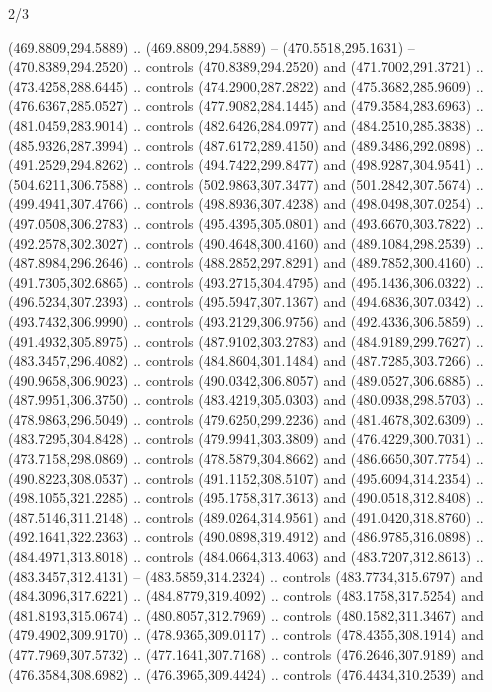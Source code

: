 \begin{flagdescription}{2/3}
\begin{scope}[xshift=0.5\flaglength,yshift=0.5\flagwidth,scale=\flagwidth/495.65]
\begin{scope}[y=0.8pt, x=0.8pt, yscale=-1,shift={(-463.76,-309.78)}]
  (469.8809,294.5889) .. (469.8809,294.5889) -- (470.5518,295.1631) --
  (470.8389,294.2520) .. controls (470.8389,294.2520) and (471.7002,291.3721) ..
  (473.4258,288.6445) .. controls (474.2900,287.2822) and (475.3682,285.9609) ..
  (476.6367,285.0527) .. controls (477.9082,284.1445) and (479.3584,283.6963) ..
  (481.0459,283.9014) .. controls (482.6426,284.0977) and (484.2510,285.3838) ..
  (485.9326,287.3994) .. controls (487.6172,289.4150) and (489.3486,292.0898) ..
  (491.2529,294.8262) .. controls (494.7422,299.8477) and (498.9287,304.9541) ..
  (504.6211,306.7588) .. controls (502.9863,307.3477) and (501.2842,307.5674) ..
  (499.4941,307.4766) .. controls (498.8936,307.4238) and (498.0498,307.0254) ..
  (497.0508,306.2783) .. controls (495.4395,305.0801) and (493.6670,303.7822) ..
  (492.2578,302.3027) .. controls (490.4648,300.4160) and (489.1084,298.2539) ..
  (487.8984,296.2646) .. controls (488.2852,297.8291) and (489.7852,300.4160) ..
  (491.7305,302.6865) .. controls (493.2715,304.4795) and (495.1436,306.0322) ..
  (496.5234,307.2393) .. controls (495.5947,307.1367) and (494.6836,307.0342) ..
  (493.7432,306.9990) .. controls (493.2129,306.9756) and (492.4336,306.5859) ..
  (491.4932,305.8975) .. controls (487.9102,303.2783) and (484.9189,299.7627) ..
  (483.3457,296.4082) .. controls (484.8604,301.1484) and (487.7285,303.7266) ..
  (490.9658,306.9023) .. controls (490.0342,306.8057) and (489.0527,306.6885) ..
  (487.9951,306.3750) .. controls (483.4219,305.0303) and (480.0938,298.5703) ..
  (478.9863,296.5049) .. controls (479.6250,299.2236) and (481.4678,302.6309) ..
  (483.7295,304.8428) .. controls (479.9941,303.3809) and (476.4229,300.7031) ..
  (473.7158,298.0869) .. controls (478.5879,304.8662) and (486.6650,307.7754) ..
  (490.8223,308.0537) .. controls (491.1152,308.5107) and (495.6094,314.2354) ..
  (498.1055,321.2285) .. controls (495.1758,317.3613) and (490.0518,312.8408) ..
  (487.5146,311.2148) .. controls (489.0264,314.9561) and (491.0420,318.8760) ..
  (492.1641,322.2363) .. controls (490.0898,319.4912) and (486.9785,316.0898) ..
  (484.4971,313.8018) .. controls (484.0664,313.4063) and (483.7207,312.8613) ..
  (483.3457,312.4131) -- (483.5859,314.2324) .. controls (483.7734,315.6797) and
  (484.3096,317.6221) .. (484.8779,319.4092) .. controls (483.1758,317.5254) and
  (481.8193,315.0674) .. (480.8057,312.7969) .. controls (480.1582,311.3467) and
  (479.4902,309.9170) .. (478.9365,309.0117) .. controls (478.4355,308.1914) and
  (477.7969,307.5732) .. (477.1641,307.7168) .. controls (476.2646,307.9189) and
  (476.3584,308.6982) .. (476.3965,309.4424) .. controls (476.4434,310.2539) and

\end{scope}
\end{scope}
\end{flagdescription}
